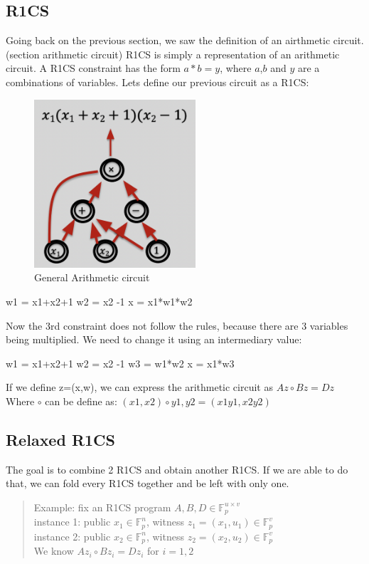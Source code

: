 \subsection{R1CS} 
Going back on the previous section, we saw the definition of an airthmetic circuit. (section arithmetic circuit)
R1CS is simply a representation of an arithmetic circuit.
A R1CS constraint has the form $a*b=y$, where $a$,$b$ and $y$ are a combinations of variables.
Lets define our previous circuit as a R1CS:
\begin{figure}[H]
    \centering
    \includegraphics[width=60mm]{ArithmeticCircuit.png}
    \caption{General Arithmetic circuit \cite{ZKM2}}
    \label{overflow}
    \end{figure}
    
    w1 = x1+x2+1
    w2 = x2 -1
    x = x1*w1*w2

    Now the 3rd constraint does not follow the rules, because there are 3 variables being multiplied.
    We need to change it using an intermediary value:
    
    w1 = x1+x2+1
    w2 = x2 -1
    w3 = w1*w2
    x = x1*w3
    \cite{ZKM3}

    If we define z=(x,w), we can express the arithmetic circuit as $ Az \circ Bz = Dz$
    Where $\circ$ can be define as: $(x1, x2) \circ y1, y2 = (x1y1, x2y2)$
\cite{ZKM10}

\subsection{Relaxed R1CS}
The goal is to combine 2 R1CS and obtain another R1CS. If we are able to do that, we can fold every R1CS together and be left with only one.

\begin{quote}

Example: fix an R1CS program $A,B,D \in \mathbb{F}^{u \times v}_p $
\\
instance 1: public $ x_1 \in \mathbb{F}^n_p $, witness $ z_1 = (x_1, u_1) \in \mathbb{F}^v_p$
\\
instance 2: public $x_2 \in \mathbb{F}^n_p $, witness $ z_2 = (x_2, u_2) \in \mathbb{F}^v_p$
\\
We know $Az_i \circ Bz_i = Dz_i$ for $ i = 1,2$
\end{quote}

